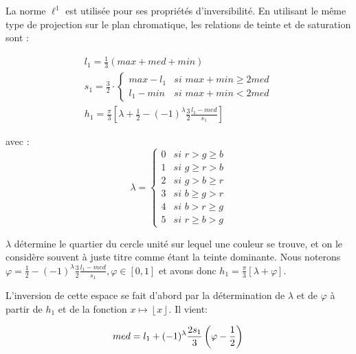 La norme $\ell^1$ est utilisée pour ses propriétés d'inversibilité. En utilisant le même type de projection sur le plan chromatique, les relations de teinte et de saturation sont :

\begin{equation}
	\begin{array}{ll}
		l_{1} = \frac{1}{3}\left({max + med + min} \right) \\
		s_{1} = \frac{3}{2}\cdot \left\{
			\begin{array}{ll}
				max - l_{1} & \textit{si $max + min \geq 2 med$} \\
				l_{1} - min & \textit{si $max + min < 2 med$}
			\end{array}
			\right. \\
		h_{1} = \frac{\pi}{3} \left[ \lambda + \frac{1}{2} - (-1)^\lambda \frac{3}{2}\frac{l_{1} - med}{s_{1}} \right]
		\end{array}
		\label{equ:norme_L1}
\end{equation}

avec :
\[
\lambda = \left\{  
	\begin{array}{ll}
		0 &  \textit{si $r > g \geq b$} \\
		1 &  \textit{si $g \geq r > b$} \\
		2 &  \textit{si $g > b \geq r$} \\
		3 &  \textit{si $b \geq g > r$} \\
		4 &  \textit{si $b > r \geq g$} \\
		5 &  \textit{si $r \geq b > g$}
	\end{array}
\right.
\]

$\lambda$ détermine le quartier du cercle unité sur lequel une couleur se trouve, et on le considère souvent à juste titre comme étant la teinte dominante. Nous noterons $\varphi = \frac{1}{2} - (-1)^{\lambda} \frac{3}{2}\frac{l_{1} - med}{s_{1}}, \varphi \in [0,1]$ et avons donc $h_{1} = \frac{\pi}{3} \left[ \lambda + \varphi \right]$.

L'inversion de cette espace se fait d'abord par la détermination de $\lambda$ et de $\varphi$ à partir de $h_1$ et de la fonction $x \mapsto \left\lfloor x \right\rfloor$. Il vient:

\[
	med = l_1 + (-1)^{\lambda} \frac{2 s_1}{3}  \left(\varphi - \frac{1}{2} \right) \\
\]


